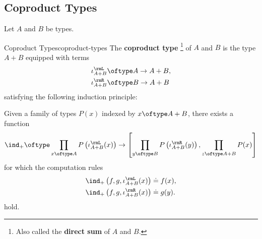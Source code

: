 \subsection{Coproduct Types}\label{subsection-coproduct-types}
Let $A$ and $B$ be types.
\begin{definition}{Coproduct Types}{coproduct-types}%
    The \textbf{coproduct type}%
    \footnote{%
        Also called the \textbf{direct sum} of $A$ and $B$.
        \par\vspace*{\TCBBoxCorrection}
    } %
    of $A$ and $B$ is the type $A+B$ equipped with terms
    \begin{align*}
        \iota^{\rmL}_{A+B} &\oftype A\to A+B,\\%
        \iota^{\rmR}_{A+B} &\oftype B\to A+B%
    \end{align*}
    satisfying the following induction principle:
    \begin{itemize}
        \itemstar Given a family of types $P(x)$ indexed by $x\oftype A+B$, there exists a function
            \[
                \ind_{+}%
                \oftype%
                \prod_{x\oftype A}P\left(\iota^{\rmL}_{A+B}(x)\right)%
                \to
                \left[\prod_{y\oftype B}P\left(\iota^{\rmR}_{A+B}(y)\right),\prod_{z\oftype A+B}P(x)\right]
            \]%
            for which the computation rules
            \begin{align*}
                \ind_{+}\left(f,g,\iota^{\rmL}_{A+B}(x)\right) &\doteq f(x),\\
                \ind_{+}\left(f,g,\iota^{\rmR}_{A+B}(x)\right) &\doteq g(y).
            \end{align*}
            hold.
    \end{itemize}
\end{definition}
